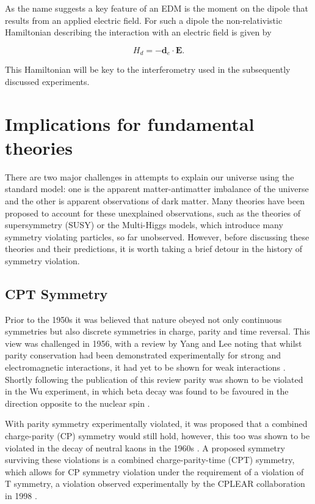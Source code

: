 As the name suggests a key feature of an EDM is the moment on the dipole that results from an applied electric field. For such a dipole the non-relativistic Hamiltonian describing the interaction with an electric field is given by

\begin{equation} \label{dipole_energy}
    H_d = - \mathbf{d}_e \cdot \mathbf{E}.
\end{equation}

This Hamiltonian will be key to the interferometry used in the subsequently discussed experiments.

\section{Implications for fundamental theories}

There are two major challenges in attempts to explain our universe using the standard model: one is the apparent matter-antimatter imbalance of the universe and the other is apparent observations of dark matter. Many theories have been proposed to account for these unexplained observations, such as the theories of supersymmetry (SUSY) or the Multi-Higgs models, which introduce many symmetry violating particles, so far unobserved. However, before discussing these theories and their predictions, it is worth taking a brief detour in the history of symmetry violation.

\subsection{CPT Symmetry}

Prior to the 1950s it was believed that nature obeyed not only continuous symmetries but also discrete symmetries in charge, parity and time reversal. This view was challenged in 1956, with a review by Yang and Lee noting that whilst parity conservation had been demonstrated experimentally for strong and electromagnetic interactions, it had yet to be shown for weak interactions \cite{Lee_Yang_1956}. Shortly following the publication of this review parity was shown to be violated in the Wu experiment, in which beta decay was found to be favoured in the direction opposite to the nuclear spin \cite{Wu_1957}.

With parity symmetry experimentally violated, it was proposed that a combined charge-parity (CP) symmetry would still hold, however, this too was shown to be violated in the decay of neutral kaons in the 1960s \cite{Cronin_fitch_1964}. A proposed symmetry surviving these violations is a combined charge-parity-time (CPT) symmetry, which allows for CP symmetry violation under the requirement of a violation of T symmetry, a violation observed experimentally by the CPLEAR collaboration in 1998 \cite{CPLEAR_1998}.

